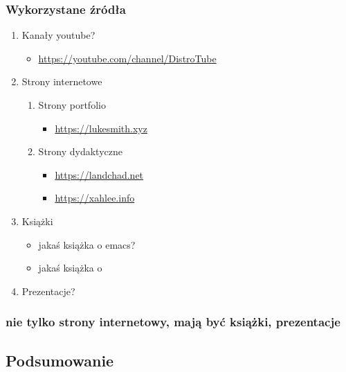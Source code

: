 \documentclass[11pt]{article}
\begin{document}
\subsubsection{Wykorzystane źródła}
\label{sec:orge04dfa3}
\begin{enumerate}
\item Kanały youtube?
\label{sec:org2b8a815}
\begin{itemize}
\item \url{https://youtube.com/channel/DistroTube}
\end{itemize}
\item Strony internetowe
\label{sec:orgd519135}
\begin{enumerate}
\item Strony portfolio
\label{sec:orga2f5ea4}
\begin{itemize}
\item \url{https://lukesmith.xyz}
\end{itemize}
\item Strony dydaktyczne
\label{sec:org9e92eaf}
\begin{itemize}
\item \url{https://landchad.net}
\item \url{https://xahlee.info}
\end{itemize}
\end{enumerate}
\item Książki
\label{sec:org21aaa9f}
\begin{itemize}
\item jakaś książka o emacs?
\item jakaś książka o
\end{itemize}
\item Prezentacje?
\label{sec:org0f6be42}
\end{enumerate}
\subsubsection{nie tylko strony internetowy, mają być książki, prezentacje}
\label{sec:orgd2344b3}
\subsection{Podsumowanie}
\label{sec:org4056448}
\end{document}
